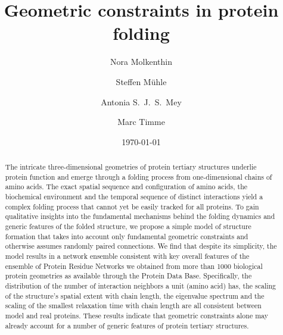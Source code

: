 \documentclass[9pt]{elife}
\begin{document}
\title{Geometric constraints in protein folding}

\author{Nora Molkenthin}
\author{Steffen Mühle}
\author{Antonia S.~J.~S.~Mey}
 \author{Marc Timme}

\date{\today}%
\begin{abstract}
The intricate three-dimensional geometries of protein tertiary structures underlie protein function and emerge through a folding process from one-dimensional chains of amino acids. The exact spatial sequence and configuration of amino acids, the biochemical environment and the temporal sequence of distinct interactions yield a complex folding process that cannot yet be easily tracked for all proteins. To gain qualitative insights into the fundamental mechanisms behind the folding dynamics and generic features of the folded structure, we propose a simple model of structure
formation that takes into account only fundamental geometric constraints and otherwise assumes randomly paired connections. We find that despite its simplicity, the model results in a network ensemble consistent with key overall features of the ensemble of Protein Residue Networks we obtained from more than 1000 biological protein geometries as available through the Protein Data Base. Specifically, the distribution of the number of interaction neighbors a unit (amino acid) has, the scaling of the structure's spatial extent with chain length, the eigenvalue spectrum and the scaling of the smallest relaxation time with chain length are all consistent between model and real proteins. These results indicate that geometric constraints alone may already account for a number of generic features of protein tertiary structures.
\end{abstract}      
\end{document}

